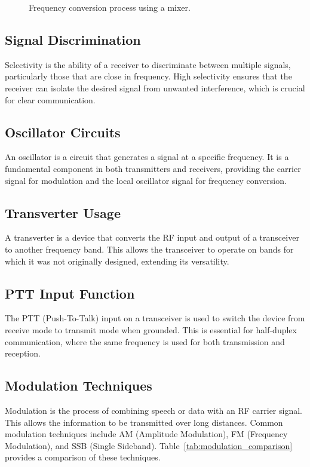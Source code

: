 \begin{figure}[h!]
    \centering
    \caption{Frequency conversion process using a mixer.}
    \label{fig:frequency_conversion}
\end{figure}

\subsection*{Signal Discrimination}
Selectivity is the ability of a receiver to discriminate between multiple signals, particularly those that are close in frequency. High selectivity ensures that the receiver can isolate the desired signal from unwanted interference, which is crucial for clear communication.

\subsection*{Oscillator Circuits}
An oscillator is a circuit that generates a signal at a specific frequency. It is a fundamental component in both transmitters and receivers, providing the carrier signal for modulation and the local oscillator signal for frequency conversion.

\subsection*{Transverter Usage}
A transverter is a device that converts the RF input and output of a transceiver to another frequency band. This allows the transceiver to operate on bands for which it was not originally designed, extending its versatility.

\subsection*{PTT Input Function}
The PTT (Push-To-Talk) input on a transceiver is used to switch the device from receive mode to transmit mode when grounded. This is essential for half-duplex communication, where the same frequency is used for both transmission and reception.

\subsection*{Modulation Techniques}
Modulation is the process of combining speech or data with an RF carrier signal. This allows the information to be transmitted over long distances. Common modulation techniques include AM (Amplitude Modulation), FM (Frequency Modulation), and SSB (Single Sideband). Table~\ref{tab:modulation_comparison} provides a comparison of these techniques.


